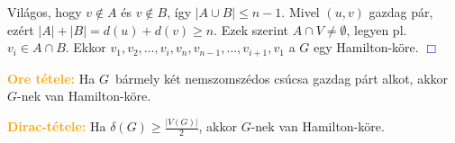 \documentclass[../szamtud.tex]{subfiles}
\begin{document}
        Világos, hogy $v \notin A$ és $v \notin B$, így $|A \cup B| \leq n-1$. Mivel $(u,v)$ gazdag pár, ezért $|A|+|B| = d(u)+d(v) \geq n$. Ezek szerint $A \cap V \neq \emptyset$, legyen pl. $v_i \in A \cap B$. Ekkor $v_1, v_2, \dots, v_i, v_n, v_{n-1}, \dots, v_{i+1}, v_1$ a $G$ egy Hamilton-köre. \textcolor{blue}{$\Box$}

        \textcolor{orange}{\textbf{Ore tétele:}} Ha $G$ bármely két nemszomszédos csúcsa gazdag párt alkot, akkor $G$-nek van Hamilton-köre.


        \textcolor{orange}{\textbf{Dirac-tétele:}} Ha $\delta(G) \geq \frac{|V(G)|}{2}$, akkor $G$-nek van Hamilton-köre.

\end{document}
